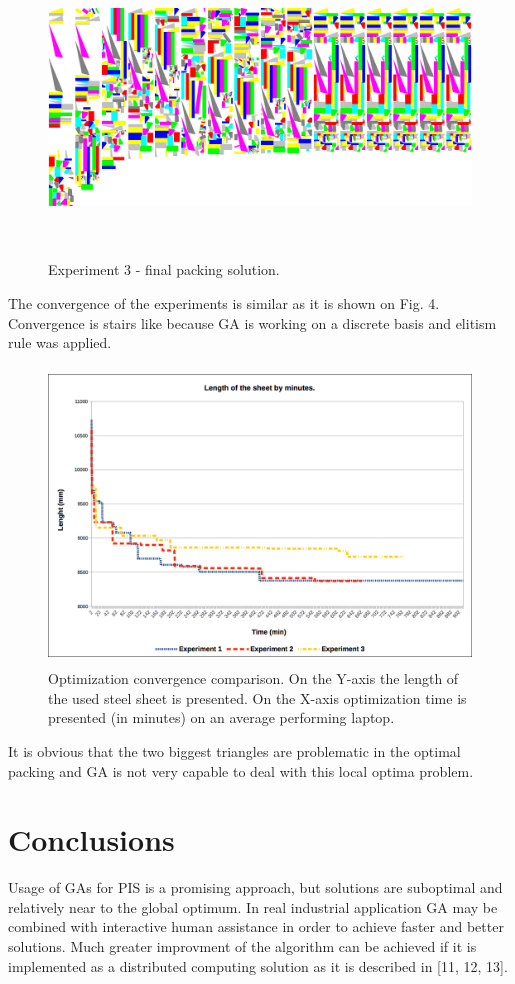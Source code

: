 \documentclass{llncs}
\begin{document}
\begin{figure}
	\centering
	\includegraphics[width=12.62cm,height=7.88cm]{fig03.png}
	\caption{Experiment 3 - final packing solution.}
	\label{fig:Graph}
\end{figure}
\FloatBarrier

The convergence of the experiments is similar as it is shown on Fig. 4. Convergence is stairs like because GA is working on a discrete basis and elitism rule was applied.

\begin{figure}
	\centering
	\includegraphics[width=12.62cm,height=7.88cm]{fig05.png}
	\caption{Optimization convergence comparison. On the Y-axis the length of the used steel sheet is presented. On the X-axis optimization time is presented (in minutes) on an average performing laptop.}
	\label{fig:Graph}
\end{figure}
\FloatBarrier
%
It is obvious that the two biggest triangles are problematic in the optimal packing and GA is not very capable to deal with this local optima problem.
%
\section{Conclusions}
%
Usage of GAs for PIS is a promising approach, but solutions are suboptimal and relatively near to the global optimum. In real industrial application GA may be combined with interactive human assistance in order to achieve faster and better solutions. Much greater improvment of the algorithm can be achieved if it is implemented as a distributed computing solution as it is described in [11, 12, 13]. 
%
\end{document}
